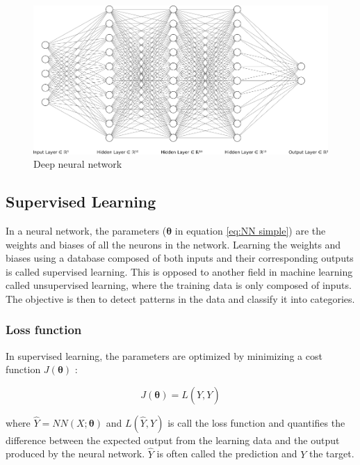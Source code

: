 \begin{figure}[h!]
    \centering
    \includegraphics[width=.9\textwidth]{images/multi layers.png}
    \caption{Deep neural network}
    \label{fig:3 layers}
\end{figure}

\subsection{Supervised Learning}

In a neural network, the parameters ($\pmb{\theta}$ in equation \ref{eq:NN simple}) are the weights and biases of all the neurons in the network. Learning the weights and biases using a database composed of both inputs and their corresponding outputs is called supervised learning. This is opposed to another field in machine learning called unsupervised learning, where the training data is only composed of inputs. The objective is then to detect patterns in the data and classify it into categories.\\

\subsubsection{Loss function}

In supervised learning, the parameters are optimized by minimizing a cost function $J(\pmb{\theta})$ :

\begin{equation} \label{eq:loss}
    J(\pmb{\theta}) = L(\hat{Y},Y)
\end{equation}

where $\hat{Y} = NN(X;\pmb{\theta})$ and $L(\hat{Y},Y)$ is call the loss function and quantifies the difference between the expected output from the learning data and the output produced by the neural network. $\hat{Y}$ is often called the prediction and $Y$ the target.\\

